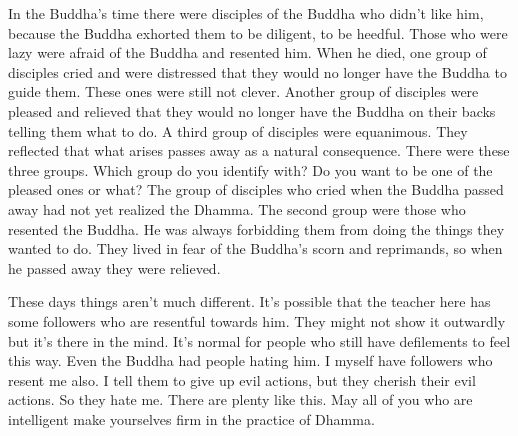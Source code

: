 In the Buddha's time there were disciples of the Buddha who didn't like him, because the Buddha exhorted them to be diligent, to be heedful. Those who were lazy were afraid of the Buddha and resented him. When he died, one group of disciples cried and were distressed that they would no longer have the Buddha to guide them. These ones were still not clever. Another group of disciples were pleased and relieved that they would no longer have the Buddha on their backs telling them what to do. A third group of disciples were equanimous. They reflected that what arises passes away as a natural consequence. There were these three groups. Which group do you identify with? Do you want to be one of the pleased ones or what? The group of disciples who cried when the Buddha passed away had not yet realized the Dhamma. The second group were those who resented the Buddha. He was always forbidding them from doing the things they wanted to do. They lived in fear of the Buddha's scorn and reprimands, so when he passed away they were relieved.

These days things aren't much different. It's possible that the teacher here has some followers who are resentful towards him. They might not show it outwardly but it's there in the mind. It's normal for people who still have defilements to feel this way. Even the Buddha had people hating him. I myself have followers who resent me also. I tell them to give up evil actions, but they cherish their evil actions. So they hate me. There are plenty like this. May all of you who are intelligent make yourselves firm in the practice of Dhamma.
